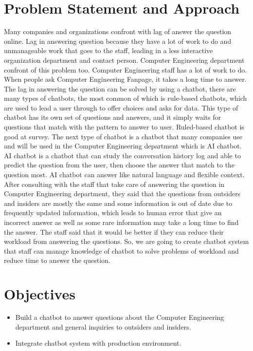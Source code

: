 \documentclass[12pt,oneside,openright,a4paper]{cpe-english-project}
\begin{document}
\section{Problem Statement and Approach} 
Many companies and organizations confront with lag of answer the question online. Lag in answering question
because they have a lot of work to do and unmanageable work that goes to the staff, leading in a less interactive organization
department and contact person. Computer Engineering department confront of this problem too. Computer Engineering
staff has a lot of work to do. When people ask Computer Engineering Fanpage, it takes a long time
to answer.\\
The lag in answering the question can be solved by using a chatbot, there are many types of chatbots, the most common of which is
rule-based chatbots, which are used to lead a user through to offer choices and asks for data. This type of chatbot has its
own set of questions and answers, and it simply waits for questions that match with the pattern to answer to user. Ruled-based chatbot
is good at survey. The next type of chatbot is a chatbot that many companies use and will be used in the
Computer Engineering department which is AI chatbot. AI chatbot is a chatbot that can study the 
conversation history log and able to predict the question from the user, then choose the answer that match
to the question most. AI chatbot can answer like natural language and flexible context.\\
After consulting with the staff that take care of answering the question in Computer
Engineering department, they said that the questions from outsiders and insiders are mostly the same
and some information is out of date due to frequently updated information, which leads to human error
that give an incorrect answer as well as some rare information may take a long time to find
the answer. The staff said that it would be better if they can reduce their workload from answering the
questions. So, we are going to create chatbot system that staff can manage knowledge of chatbot to solve
problems of workload and reduce time to answer the question.

\section{Objectives}
\begin{itemize}
\item  Build a chatbot to answer questions about the Computer Engineering department and general inquiries to outsiders and insiders.
\item  Integrate chatbot system with production environment.
\end{itemize}
\end{document}
